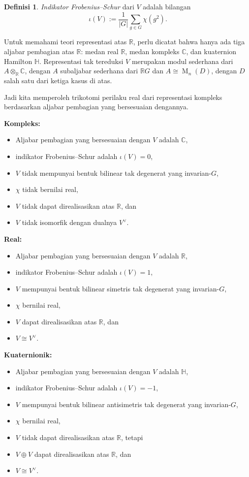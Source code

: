 \documentclass[12pt]{article}
\theoremstyle{plain}
\theoremstyle{definition}
\newtheorem{definition}[theorem]{Definisi}
\theoremstyle{remark}
\numberwithin{equation}{section}
\begin{document}
\begin{definition}
\emph{Indikator Frobenius--Schur} dari $V$ adalah bilangan
\[
\iota(V) := \frac{1}{|G|}\sum_{g \in G} \chi(g^2).
\]
\end{definition}

Untuk memahami teori representasi atas $\mathbb{R}$,
perlu dicatat bahwa hanya ada tiga aljabar pembagian
atas $\mathbb{R}$:
medan real $\mathbb{R}$,
medan kompleks $\mathbb{C}$, dan
kuaternion Hamilton $\mathbb{H}$.
Representasi tak tereduksi $V$ merupakan modul sederhana dari
$A \otimes_{\mathbb{R}} \mathbb{C}$, dengan $A$ subaljabar sederhana dari
$\mathbb{R}G$ dan $A \cong \operatorname{M}_n(D)$, dengan $D$ salah satu
dari ketiga kasus di atas.

Jadi kita memperoleh trikotomi perilaku real dari representasi
kompleks berdasarkan aljabar pembagian yang
bersesuaian dengannya.

\pagebreak

\noindent
\textbf{Kompleks:}
\begin{itemize}
\item Aljabar pembagian yang bersesuaian dengan $V$ adalah $\mathbb{C}$,
\item indikator Frobenius--Schur adalah $\iota(V)=0$,
\item $V$ tidak mempunyai bentuk bilinear tak degenerat yang invarian-$G$,
\item $\chi$ tidak bernilai real,
\item $V$ tidak dapat direalisasikan atas $\mathbb{R}$, dan
\item $V$ tidak isomorfik dengan dualnya $V^\vee$.
\end{itemize}

\noindent
\textbf{Real:}
\begin{itemize}
\item Aljabar pembagian yang bersesuaian dengan $V$ adalah $\mathbb{R}$,
\item indikator Frobenius--Schur adalah $\iota(V)=1$,
\item $V$ mempunyai bentuk bilinear simetris tak degenerat yang invarian-$G$,
\item $\chi$ bernilai real,
\item $V$ dapat direalisasikan atas $\mathbb{R}$, dan
\item $V \cong V^\vee$.
\end{itemize}

\noindent
\textbf{Kuaternionik:}
\begin{itemize}
\item Aljabar pembagian yang bersesuaian dengan $V$ adalah $\mathbb{H}$,
\item indikator Frobenius--Schur adalah $\iota(V)=-1$,
\item $V$ mempunyai bentuk bilinear antisimetris tak degenerat yang invarian-$G$,
\item $\chi$ bernilai real,
\item $V$ tidak dapat direalisasikan atas $\mathbb{R}$, tetapi
\item $V \oplus V$ dapat direalisasikan atas $\mathbb{R}$, dan
\item $V \cong V^\vee$.
\end{itemize}
\end{document}
